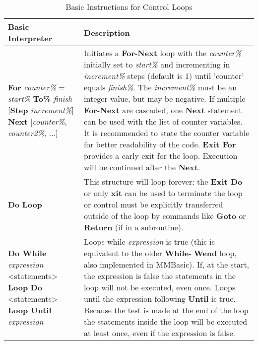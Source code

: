 \begin{table}[]
\centering
\caption{Basic Instructions for Control Loops}
\label{Basic_Instructions_for_Control_Loops}
\begin{tabular}{|p{4cm}|p{10cm}|}
\hline
\textbf{Basic Interpreter} & \textbf{Description}                                                     \\ \hline
\textbf{For} \textit{counter\%} = \textit{start\%} \textbf{To\%} \textit{finish} [\textbf{Step} \textit{increment\%}] \newline
\textbf{Next} [\textit{counter\%}, \textit{counter2\%}, ...]
& Initiates a \textbf{For}-\textbf{Next} loop with the \textit{counter\%} initially set to \textit{start\%} and incrementing in \textit{increment\%} steps (default is 1) until 'counter' equals \textit{finish\%}. The \textit{increment\%} must be an integer value, but may be negative.\newline
If multiple \textbf{For}-\textbf{Next} are cascaded, one \textbf{Next} statement can be used with the list of counter variables. It is recommended to state the counter variable for better readability of the code.\newline
\textbf{Exit For} provides a early exit for the loop. Execution will be continued after the \textbf{Next}.
\\ \hline
\textbf{Do}\newline
\textbf{Loop}\newline
& This structure will loop forever; the \textbf{Exit Do} or only \textbf{xit} can be used to
terminate the loop or control must be explicitly transferred outside of the
loop by commands like \textbf{Goto} or \textbf{Return} (if in a subroutine).
\\ \hline
\textbf{Do While} \textit{expression}\newline
<statements>\newline
\textbf{Loop}\newline\newline
\textbf{Do}\newline
<statements>\newline
\textbf{Loop Until} \textit{expression}
& 
Loops while \textit{expression} is true (this is equivalent to the older \textbf{While}-
\textbf{Wend} loop, also implemented in MMBasic). \newline
If, at the start, the expression is false the statements in the loop will not be executed, even
once.\newline
Loops until the expression following \textbf{Until} is true. Because the test is
made at the end of the loop the statements inside the loop will be
executed at least once, even if the expression is false.
\\ \hline
\end{tabular}
\end{table}


